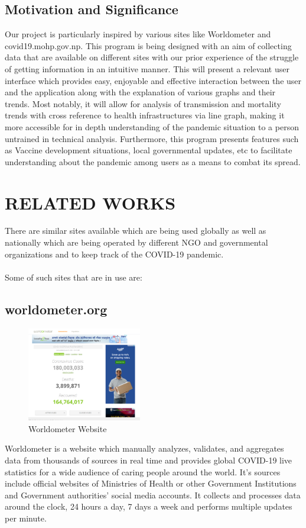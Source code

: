 \documentclass{article}
\begin{document}
\vspace*{5mm}
\subsection{Motivation and Significance}
Our project is particularly inspired by various sites like Worldometer and covid19.mohp.gov.np. This program is being designed with an aim of collecting data that 
are available on different sites with our prior experience of the struggle of getting information in an intuitive manner. This will present a relevant user interface 
which provides easy, enjoyable and effective interaction between the user and the application along with the explanation of various graphs and their trends. Most 
notably, it will allow for analysis of transmission and mortality trends with cross reference to health infrastructures via line graph, making it more accessible 
for in depth understanding of the pandemic situation to a person untrained in technical analysis. Furthermore, this program presents features such as Vaccine 
development situations, local governmental updates, etc to facilitate understanding about the pandemic among users as a means to combat its spread.

\clearpage

\section{RELATED WORKS}
There are similar sites available which are being used globally as well as nationally which are being operated by different NGO and governmental organizations and 
to keep track of the COVID-19 pandemic.
\\\\
Some of such sites that are in use are:

\subsection{worldometer.org}
\begin{figure}[h]
    \centerline{\includegraphics[width = 50mm]{worldometer.png}}
    \caption{Worldometer Website}
    \label{fig}
\end{figure}
Worldometer is a website which manually analyzes, validates, and aggregates data from thousands of sources in real time and provides global COVID-19 live statistics for a wide audience of caring people around the world. It's sources include official websites of Ministries of Health or other Government Institutions and Government authorities' social media accounts. It collects and processes data around the clock, 24 hours a day, 7 days a week and performs multiple updates per minute. 
\end{document}
